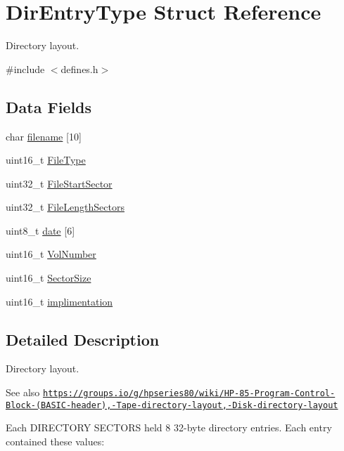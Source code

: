 \hypertarget{structDirEntryType}{}\section{Dir\+Entry\+Type Struct Reference}
\label{structDirEntryType}


Directory layout.  




{\ttfamily \#include $<$defines.\+h$>$}

\subsection*{Data Fields}
\begin{DoxyCompactItemize}
\item 
char \hyperlink{structDirEntryType_aa60fae0a6b7ba9c966cbcf46e555f396}{filename} \mbox{[}10\mbox{]}
\item 
uint16\+\_\+t \hyperlink{structDirEntryType_a97b6ddc8d198c32bf4a29c4784ab7188}{File\+Type}
\item 
uint32\+\_\+t \hyperlink{structDirEntryType_a062849a9cc935042c7a3a28ed90ab6a1}{File\+Start\+Sector}
\item 
uint32\+\_\+t \hyperlink{structDirEntryType_a0ad3a6b6da198caa68e7e82d025975cb}{File\+Length\+Sectors}
\item 
uint8\+\_\+t \hyperlink{structDirEntryType_a1850264d3e4eac53b665a702ac7000fd}{date} \mbox{[}6\mbox{]}
\item 
uint16\+\_\+t \hyperlink{structDirEntryType_a2fe2eefd68aafcce0bb14bf53e4cba00}{Vol\+Number}
\item 
uint16\+\_\+t \hyperlink{structDirEntryType_ab92ab53cd08e0ffe0f0098c583ce5eba}{Sector\+Size}
\item 
uint16\+\_\+t \hyperlink{structDirEntryType_ac406aba583917a5c26ed94df41a368a9}{implimentation}
\end{DoxyCompactItemize}


\subsection{Detailed Description}
Directory layout. 

\begin{DoxySeeAlso}{See also}
\href{https://groups.io/g/hpseries80/wiki/HP-85-Program-Control-Block-(BASIC-header),-Tape-directory-layout,-Disk-directory-layout}{\tt https\+://groups.\+io/g/hpseries80/wiki/\+H\+P-\/85-\/\+Program-\/\+Control-\/\+Block-\/(\+B\+A\+S\+I\+C-\/header),-\/\+Tape-\/directory-\/layout,-\/\+Disk-\/directory-\/layout}
\end{DoxySeeAlso}
Each D\+I\+R\+E\+C\+T\+O\+RY S\+E\+C\+T\+O\+RS held 8 32-\/byte directory entries. Each entry contained these values\+:

